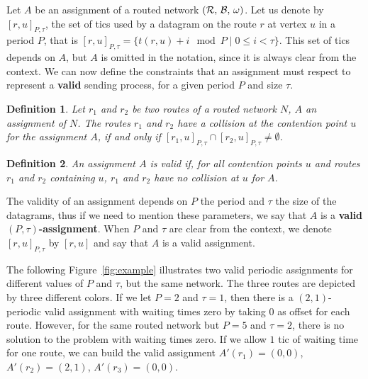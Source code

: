 \documentclass[a4paper,10pt]{journal}
\newtheorem{definition}{Definition}
\begin{document}
 	Let $A$ be an assignment of a routed network $(\cal{R},\,\cal{B},\,\omega)$.
    Let us denote by $[r,u]_{P,\tau}$, the set of tics used by a datagram on the route $r$ at vertex $u$ in a period $P$, that is $[r,u]_{P,\tau} = \{t(r,u) + i \mod P \mid 0 \leq i < \tau \}$. This set of tics depends on $A$, but $A$ is omitted in the notation, since it is always clear from the context. We can now define the constraints that an assignment must respect to represent a \textbf{valid}
    sending process, for a given period $P$ and size $\tau$.


    \begin{definition}
    Let $r_1$ and $r_2$ be two routes of a routed network $N$, $A$ an assignment of $N$. The routes $r_1$ and $r_2$ have a collision at the contention point $u$ for the assignment $A$, if and only if $[r_1,u]_{P,\tau} \cap [r_2,u]_{P,\tau} \neq \emptyset$.
    \end{definition}
    
    \begin{definition}
    An assignment $A$ is valid if, for all contention points $u$ and routes $r_1$ and $r_2$ containing $u$, $r_1$ and $r_2$ have no collision at $u$ for $A$. 
    \end{definition}

    The validity of an assignment depends on $P$ the period and $\tau$ the size of the datagrams, thus if we need to mention these parameters, we say that $A$ is a \textbf{valid $(P,\tau)$-assignment}. When $P$ and $\tau$ are clear from the context, we denote $[r,u]_{P,\tau}$ by $[r,u]$ and say that $A$ is a valid assignment. 

\begin{examplee}

    The following Figure~\ref{fig:example} illustrates two valid periodic assignments for different values of $P$ and $\tau$, but the same network. The three routes are depicted by three different colors. If we let $P = 2$ and $\tau = 1$, then there is a $(2,1)$-periodic valid assignment with waiting times zero by taking $0$ as offset for each route. However, for the same routed network but $P=5$ and $\tau = 2$, there is no solution to the problem with waiting times zero. If we allow $1$ tic of waiting time for one route, we can build the valid assignment $A'(r_1) = (0,0)$, $A'(r_2) = (2,1)$, $A'(r_3)= (0,0)$.

\end{examplee}
  
\end{document}
